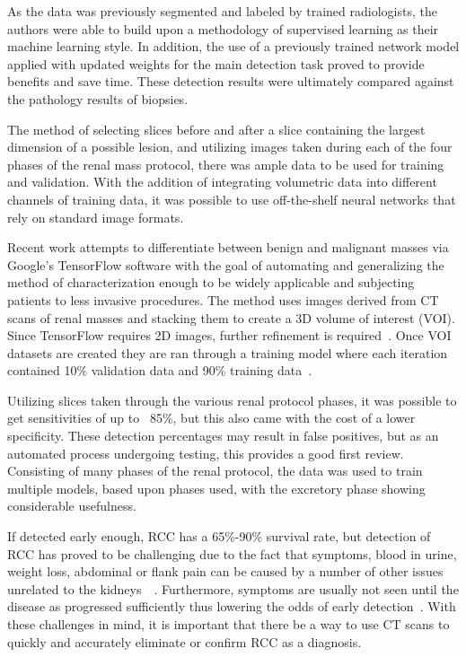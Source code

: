 \documentclass[10pt,journal,compsoc]{IEEEtran}
\begin{document}
As the data was previously segmented and labeled by trained radiologists, the authors were able to build upon a methodology of supervised learning as their machine learning style. In addition, the use of a previously trained network model applied with updated weights for the main detection task proved to provide benefits and save time. These detection results were ultimately compared against the pathology results of biopsies.


The method of selecting slices before and after a slice containing the largest dimension of a possible lesion, and utilizing images taken during each of the four phases of the renal mass protocol, there was ample data to be used for training and validation. With the addition of integrating volumetric data into different channels of training data, it was possible to use off-the-shelf neural networks that rely on standard image formats. 


Recent work attempts to differentiate between benign and malignant masses via Google’s TensorFlow software with the goal of automating and generalizing the method of characterization enough to be widely applicable and subjecting patients to less invasive procedures.   The method uses images derived from CT scans of renal masses and stacking them to create a 3D volume of interest (VOI).  Since TensorFlow requires 2D images, further refinement is required~\cite{cite5}. Once VOI datasets are created they are ran through a training model where each iteration contained 10\% validation data and 90\% training data~\cite{cite5}.  

Utilizing slices taken through the various renal protocol phases, it was possible to get sensitivities of up to ~85\%, but this also came with the cost of a lower specificity. These detection percentages may result in false positives, but as an automated process undergoing testing, this provides a good first review.  Consisting of many phases of the renal protocol, the data was used to train multiple models, based upon phases used, with the excretory phase showing considerable usefulness. 


If detected early enough, RCC has a 65\%-90\% survival rate, but detection of RCC has proved to be challenging due to the fact that symptoms, blood in urine, weight loss, abdominal or flank pain can be caused by a number of other issues unrelated to the kidneys~\cite{cite6}~\cite{cite7}. Furthermore, symptoms are usually not seen until the disease as progressed sufficiently thus lowering the odds of early detection~\cite{cite6}.  With these challenges in mind, it is important that there be a way to use CT scans to quickly and accurately eliminate or confirm RCC as a diagnosis.  
\end{document}

